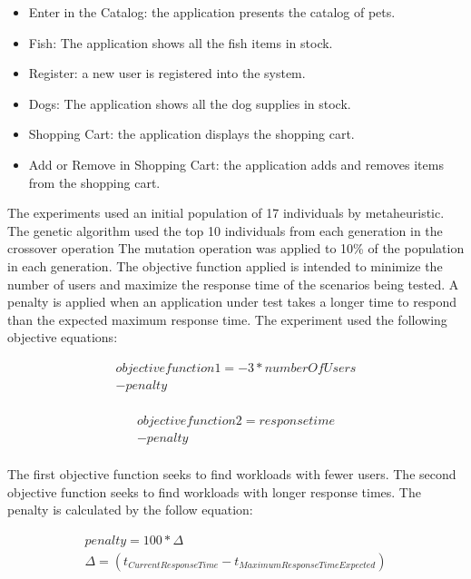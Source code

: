 \documentclass[espaco=umemeio,chapter=TITLE,twoside,openright]{abnt}
\begin{document}
\begin{itemize}
\item Enter in the Catalog: the application presents the catalog of pets.
\item Fish: The application shows all the fish items in stock.
\item Register:  a new user is registered into the system.
\item Dogs: The application shows all the dog supplies in stock.
\item Shopping Cart: the application displays the shopping cart.
\item Add or Remove in Shopping Cart: the application adds and removes items from the shopping cart.
\end{itemize}

The experiments used an initial population of 17 individuals by metaheuristic. The genetic algorithm used the top 10 individuals from each generation in the crossover operation  The mutation operation was applied to 10\% of the population in each generation. The objective function applied is intended to minimize the number of users and maximize the response time of the scenarios being tested. A penalty is applied when an application under test takes a longer time to respond than the expected maximum response time. The experiment used the following objective equations:

\begin{equation}
\begin{aligned}
objective function 1 =-3*numberOfUsers\\
-penalty\\
\end{aligned}
\end{equation}


\begin{equation}
\begin{aligned}
objective function 2 =responsetime\\
-penalty\\
\end{aligned}
\end{equation}

The first objective function seeks to find workloads with fewer users. The second objective function seeks to find workloads with  longer response times. The penalty is calculated by the follow equation:

\begin{equation}
\begin{aligned}
penalty=100 * \Delta \\
\Delta=(t_{Current Response Time} - t_{Maximum Response Time Expected})\\
\end{aligned}
\end{equation}
\end{document}
